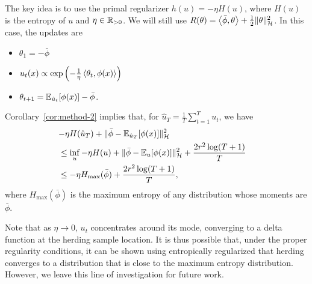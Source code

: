 \documentclass[paper.tex]{subfiles}
\begin{document}
The key idea is to use the primal regularizer $h(u) = -\eta H(u)$, where 
$H(u)$ is the entropy of $u$ and $\eta \in \mathbb{R}_{>0}$. We will still use 
$R(\theta) = \left\langle \bar{\phi}, \theta \right\rangle + \frac{1}{2} \|\theta\|_{\mathcal{H}}^2$.
In this case, the \dual updates are
\begin{itemize}
\item $\theta_1 = -\bar{\phi}$
\item $u_t(x) \propto \exp\left(-\frac{1}{\eta}\left\langle \theta_t, \phi(x) \right\rangle\right)$
\item $\theta_{t+1} = \mathbb{E}_{\hat{u}_t}[\phi(x)] - \bar\phi$.
\end{itemize}
Corollary~\ref{cor:method-2} implies that, for 
$\hat{u}_T = \frac{1}{T} \sum_{t=1}^T u_t$, we have
\begin{align*}
\lefteqn{-\eta H(\hat{u}_T) + \|\bar{\phi}-\bE_{\hat{u}_T}[\phi(x)]\|_{\sH}^2} \\
 &\leq \inf_{u} -\eta H(u) + \|\bar{\phi}-\bE_{u}[\phi(x)]\|_{\sH}^2 + \frac{2r^2\log(T+1)}{T} \\
 &\leq -\eta H_{\max}(\bar{\phi}) + \frac{2r^2\log(T+1)}{T},
\end{align*}
where $H_{\max}(\bar{\phi})$ is the maximum entropy of any distribution whose 
moments are $\bar{\phi}$.

Note that as $\eta \to 0$, $u_{t}$ concentrates around its mode, converging to a delta function at the herding sample location. It is thus possible that, under the proper regularity conditions, it can be shown using entropically regularized \bmd that herding converges to a distribution that is close to the maximum entropy distribution. However, we leave this line of investigation for future work. 
\end{document}
